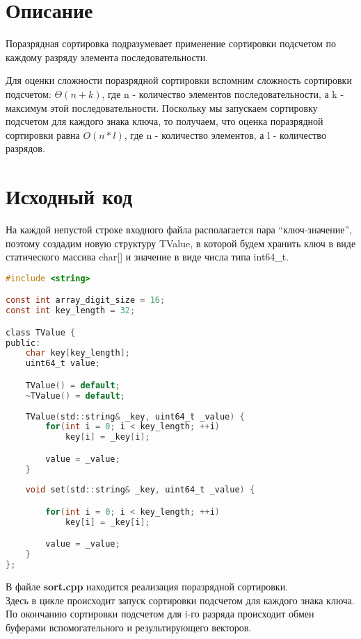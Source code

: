 \section{Описание}
Поразрядная сортировка подразумевает применение сортировки подсчетом по каждому разряду элемента последовательности. 

Для оценки сложности поразрядной сортировки вспомним сложность сортировки подсчетом: $\Theta(n + k)$, где n - количество элементов последовательности, а k - максимум этой последовательности. 
Поскольку мы запускаем сортировку подсчетом для каждого знака ключа, то получаем, что оценка поразрядной сортировки равна $O(n * l)$, где n - количество элементов, а l - количество разрядов. 


\pagebreak

\section{Исходный код}
На каждой непустой строке входного файла располагается пара \enquote{ключ-значение}, поэтому создадим новую 
структуру {\ttfamily TValue}, в которой будем хранить ключ в виде статического массива  {\ttfamily char[]} и значение в виде числа типа {\ttfamily int64\_t}. 

\begin{lstlisting}[language=C]
#include <string>

const int array_digit_size = 16;
const int key_length = 32;

class TValue {   
public:
    char key[key_length];
    uint64_t value; 

    TValue() = default;
    ~TValue() = default;
    
    TValue(std::string& _key, uint64_t _value) {
        for(int i = 0; i < key_length; ++i) 
            key[i] = _key[i];

        value = _value;
    }
    
    void set(std::string& _key, uint64_t _value) {

        for(int i = 0; i < key_length; ++i) 
            key[i] = _key[i];

        value = _value;
    }
};

\end{lstlisting}

В файле \textbf{sort.cpp} находится реализация поразрядной сортировки. \\
Здесь в цикле происходит запуск сортировки подсчетом для каждого знака ключа. По окончанию сортировки подсчетом для i-го разряда происходит обмен буферами вспомогательного и результирующего векторов.

